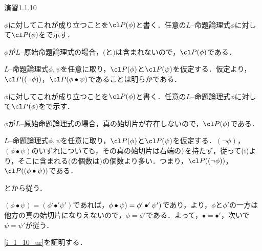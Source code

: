 \begin{excfield}{演習1.1.10}
\begin{lem}
    \begin{myenum}[n]
      \item $\phi$に対してこれが成り立つことを$\cl P (\phi)$と書く．任意の$L$--命題論理式$\phi$に対して$\cl P (\phi)$をで示す．
      \begin{step}
        \item $\phi$が$L$--原始命題論理式の場合，$($と$)$は含まれないので，$\cl P (\phi)$である．
        \item $L$--命題論理式$\phi, \psi$を任意に取り，$\cl P (\phi)$と$\cl P (\psi)$を仮定する．仮定より，$\cl P ((\lnot \phi))$，$\cl P (\phi \bullet \psi)$であることは明らかである．
      \end{step}
      \item $\phi$に対してこれが成り立つことを$\cl P (\phi)$と書く．任意の$L$--命題論理式$\phi$に対して$\cl P (\phi)$をで示す．
      \begin{step}
        \item $\phi$が$L$--原始命題論理式の場合，真の始切片が存在しないので，$\cl P (\phi)$である．
        \item $L$--命題論理式$\phi, \psi$を任意に取り，$\cl P (\phi)$と$\cl P (\psi)$を仮定する．$(\lnot \phi)$，$(\phi \bullet \psi)$のいずれについても，その真の始切片は右端の$\noprint{(})$を持たず，従って(i)より，そこに含まれる$($の個数は$)$の個数より多い．つまり，$\cl P ((\lnot \phi))$，$\cl P ((\phi \bullet \psi))$である．
      \end{step}
      \item {}とから従う．
      \item $(\phi \bullet \psi) = (\phi' \mathbin{\bullet'} \psi')$であれば，$\noprint{(}\phi \bullet \psi) = \noprint{(}\phi' \mathbin{\bullet'} \psi')$であり，より，$\phi$と$\phi'$の一方は他方の真の始切片になりえないので，$\phi = \phi'$である．よって，$\bullet = \bullet'$，次いで$\psi = \psi'$が従う．
    \end{myenum}
  \end{lem}

  \cref{i_1_10_ur}を証明する．


\end{excfield}
